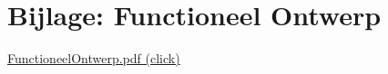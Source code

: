\appendix

\section{Bijlage: Functioneel Ontwerp} \label{sec:FunctioneelOntwerp}

\href{run:FunctioneelOntwerp.pdf}{FunctioneelOntwerp.pdf (click)}